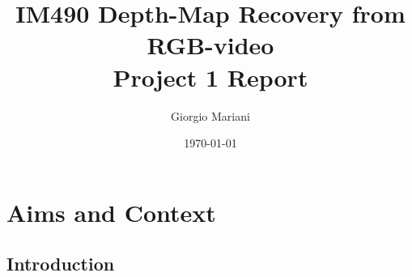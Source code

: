 \documentclass[notitlepage,english]{hgbreport}
\author{Giorgio Mariani}										%
\title{IM490 Depth-Map Recovery from RGB-video\\	%
				\textbf{Project 1 Report}}	%
\date{\today}
\begin{document}

\maketitle

\begin{abstract}\noindent
\bigskip
\noindent
\end{abstract}


\tableofcontents



\chapter{Aims and Context}





\section{Introduction}
\label{sec:introduction}
\end{document}
